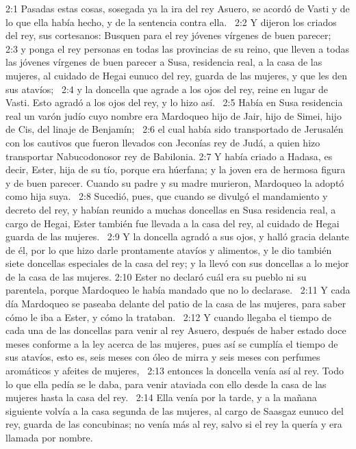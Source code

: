2:1 Pasadas estas cosas, sosegada ya la ira del rey Asuero, se acordó de Vasti y de lo que ella había hecho, y de la sentencia contra ella.  
2:2 Y dijeron los criados del rey, sus cortesanos: Busquen para el rey jóvenes vírgenes de buen parecer;  
2:3 y ponga el rey personas en todas las provincias de su reino, que lleven a todas las jóvenes vírgenes de buen parecer a Susa, residencia real, a la casa de las mujeres, al cuidado de Hegai eunuco del rey, guarda de las mujeres, y que les den sus atavíos;  
2:4 y la doncella que agrade a los ojos del rey, reine en lugar de Vasti. Esto agradó a los ojos del rey, y lo hizo así.  
2:5 Había en Susa residencia real un varón judío cuyo nombre era Mardoqueo hijo de Jair, hijo de Simei, hijo de Cis, del linaje de Benjamín;  
2:6 el cual había sido transportado de Jerusalén con los cautivos que fueron llevados con Jeconías rey de Judá, a quien hizo transportar Nabucodonosor rey de Babilonia. 
2:7 Y había criado a Hadasa, es decir, Ester, hija de su tío, porque era húerfana; y la joven era de hermosa figura y de buen parecer. Cuando su padre y su madre murieron, Mardoqueo la adoptó como hija suya.  
2:8 Sucedió, pues, que cuando se divulgó el mandamiento y decreto del rey, y habían reunido a muchas doncellas en Susa residencia real, a cargo de Hegai, Ester también fue llevada a la casa del rey, al cuidado de Hegai guarda de las mujeres.  
2:9 Y la doncella agradó a sus ojos, y halló gracia delante de él, por lo que hizo darle prontamente atavíos y alimentos, y le dio también siete doncellas especiales de la casa del rey; y la llevó con sus doncellas a lo mejor de la casa de las mujeres. 
2:10 Ester no declaró cuál era su pueblo ni su parentela, porque Mardoqueo le había mandado que no lo declarase.  
2:11 Y cada día Mardoqueo se paseaba delante del patio de la casa de las mujeres, para saber cómo le iba a Ester, y cómo la trataban.  
2:12 Y cuando llegaba el tiempo de cada una de las doncellas para venir al rey Asuero, después de haber estado doce meses conforme a la ley acerca de las mujeres, pues así se cumplía el tiempo de sus atavíos, esto es, seis meses con óleo de mirra y seis meses con perfumes aromáticos y afeites de mujeres,  
2:13 entonces la doncella venía así al rey. Todo lo que ella pedía se le daba, para venir ataviada con ello desde la casa de las mujeres hasta la casa del rey.  
2:14 Ella venía por la tarde, y a la mañana siguiente volvía a la casa segunda de las mujeres, al cargo de Saasgaz eunuco del rey, guarda de las concubinas; no venía más al rey, salvo si el rey la quería y era llamada por nombre.  

